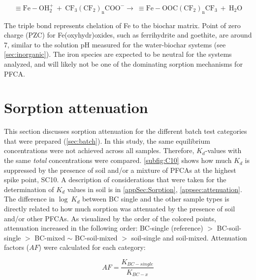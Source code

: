 \begin{equation}
    \mathrm{\equiv Fe-OH_2^+ ~ + ~ CF_3(CF_2)_nCOO^- \rightarrow ~ \equiv Fe-OOC(CF_2)_nCF_3 ~+~ H_2O}
\end{equation}

The triple bond represents chelation of Fe to the biochar matrix. Point of zero charge (PZC) for Fe(oxyhydr)oxides, such as ferrihydrite and goethite, are around 7, similar to the solution pH measured for the water-biochar systems (see \cref{sec:inorganic}). The iron species are expected to be neutral for the systems analyzed, and will likely not be one of the dominating sorption mechanisms for PFCA. 


\section{Sorption attenuation}
This section discusses sorption attenuation for the different batch test categories that were prepared (\cref{sec:batch}). In this study, the same equilibrium concentrations were not achieved across all samples. Therefore, $K_d$-values with the same \textit{total} concentrations were compared. \cref{subfig:C10} shows how much $K_d$ is suppressed by the presence of soil and/or a mixture of PFCAs at the highest spike point, SC10. A description of considerations that were taken for the determination of $K_d$ values in soil is in \cref{appSec:Sorption}, \cref{appsec:attenuation}. The difference in $\log~K_d$ between BC single and the other sample types is directly related to how much sorption was attenuated by the presence of soil and/or other PFCAs. As visualized by the order of the colored points, attenuation increased in the following order: BC-single (reference) $>$ BC-soil-single $>$ BC-mixed $\sim$ BC-soil-mixed $>$ soil-single and soil-mixed. Attenuation factors ($AF$) were calculated for each category:

\begin{equation} \label{eq:$AF$}
    AF = \frac{K_{BC-single}}{K_{BC-x}}
\end{equation}

